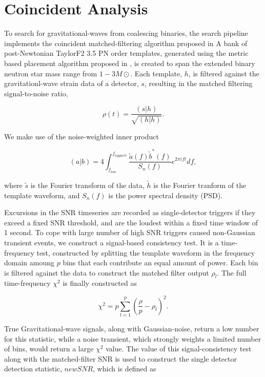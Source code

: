 \section{Coincident Analysis}
\label{sec:pipeline}

To search for gravitational-waves from coalescing binaries, the search pipeline implements the coincident matched-filtering algorithm proposed in \cite{samanta} A bank of post-Newtonian TaylorF2 3.5 PN order templates, generated using the metric based placement algorithm proposed in \cite{brown}, is created to span the extended binary neutron star mass range from $1-3 M\odot$. Each template, $h$, is filtered against the gravitationl-wave strain data of a detector, $s$, resulting in the matched filtering signal-to-noise ratio,

\begin{equation}
\rho (t) = \frac{(s|h)}{\sqrt{(h|h)}}.
\end{equation}

We make use of the noise-weighted inner product

\begin{equation}
(a|b) = 4 \int^{f_{nyquist}}_{f_{low}} \frac{\tilde{a}(f) \tilde{b}^*(f)} {S_n(f)} e^{2\pi i ft} df,
\end{equation}

where $\tilde{s}$ is the Fourier transform of the data, $\tilde{h}$ is the Fourier tranform of the template waveform, and $S_n(f)$ is the power spectral density (PSD).

Excursions in the SNR timeseries are recorded as single-detector triggers if they exceed a fixed SNR threshold, and are the loudest within a fixed time window of 1 second. To cope with large number of high SNR triggers caused non-Gaussian transient events, we construct a signal-based consistency test. It is a time-frequency test, constructed by splitting the template waveform in the frequency domain amoung $p$ bins that each contribute an equal amount of power. Each bin is filtered against the data to construct the matched filter output $\rho_l$. The full time-frequency $\chi^2$ is finally constructed as

\begin{equation}
\chi^2 = p \sum^p_{l=1} \left( \frac{\rho}{p} - \rho_l \right)^2.
\end{equation}

True Gravitational-wave signals, along with Gaussian-noise, return a low number for this statistic, while a noise transient, which strongly weights a limited number of bins, would return a large $\chi^2$ value. The value of this signal-consistency test along with the matched-filter SNR is used to construct the single detector detection statistic, $new SNR$, which is defined as

